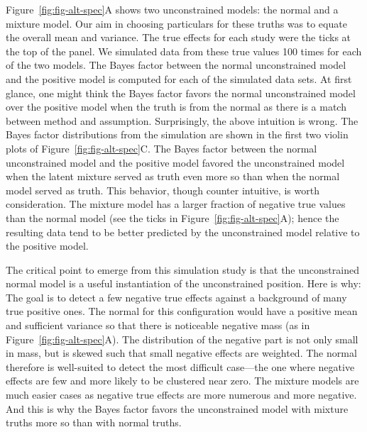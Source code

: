 \documentclass[english,man]{apa6}
\theoremstyle{definition}
\theoremstyle{definition}
\theoremstyle{definition}
\theoremstyle{remark}
\begin{document}
Figure~\ref{fig:fig-alt-spec}A shows two unconstrained models: the
normal and a mixture model. Our aim in choosing particulars for these
truths was to equate the overall mean and variance. The true effects for
each study were the ticks at the top of the panel. We simulated data
from these true values 100 times for each of the two models. The Bayes
factor between the normal unconstrained model and the positive model is
computed for each of the simulated data sets. At first glance, one might
think the Bayes factor favors the normal unconstrained model over the
positive model when the truth is from the normal as there is a match
between method and assumption. Surprisingly, the above intuition is
wrong. The Bayes factor distributions from the simulation are shown in
the first two violin plots of Figure~\ref{fig:fig-alt-spec}C. The Bayes
factor between the normal unconstrained model and the positive model
favored the unconstrained model when the latent mixture served as truth
even more so than when the normal model served as truth. This behavior,
though counter intuitive, is worth consideration. The mixture model has
a larger fraction of negative true values than the normal model (see the
ticks in Figure~\ref{fig:fig-alt-spec}A); hence the resulting data tend
to be better predicted by the unconstrained model relative to the
positive model.

The critical point to emerge from this simulation study is that the
unconstrained normal model is a useful instantiation of the
unconstrained position. Here is why: The goal is to detect a few
negative true effects against a background of many true positive ones.
The normal for this configuration would have a positive mean and
sufficient variance so that there is noticeable negative mass (as in
Figure~\ref{fig:fig-alt-spec}A). The distribution of the negative part
is not only small in mass, but is skewed such that small negative
effects are weighted. The normal therefore is well-suited to detect the
most difficult case---the one where negative effects are few and more
likely to be clustered near zero. The mixture models are much easier
cases as negative true effects are more numerous and more negative. And
this is why the Bayes factor favors the unconstrained model with mixture
truths more so than with normal truths.
\end{document}
